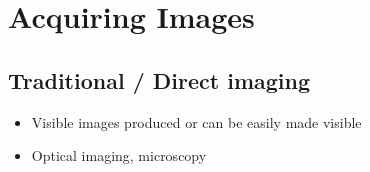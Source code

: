 \documentclass[letterpaper,10pt,english]{sphinxmanual}
\begin{document}
\section{Acquiring Images}
\label{\detokenize{01-Introduction:acquiring-images}}

\subsection{Traditional / Direct imaging}
\label{\detokenize{01-Introduction:traditional-direct-imaging}}\begin{itemize}
\item {} 
\sphinxAtStartPar
Visible images produced or can be easily made visible

\item {} 
\sphinxAtStartPar
Optical imaging, microscopy

\end{itemize}
\end{document}
